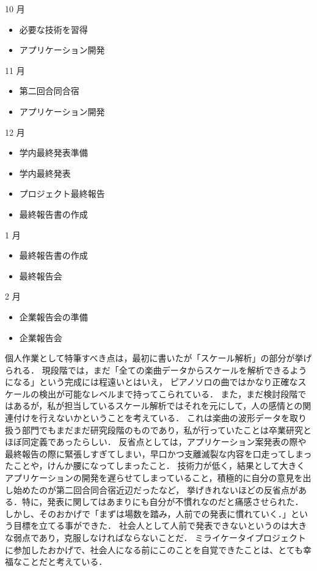 10 月
\begin{itemize}
\item 必要な技術を習得
\item アプリケーション開発
\end{itemize}
11 月
\begin{itemize}
\item 第二回合同合宿
\item アプリケーション開発
\end{itemize}
12 月
\begin{itemize}
\item 学内最終発表準備
\item 学内最終発表
\item プロジェクト最終報告
\item 最終報告書の作成
\end{itemize}
1 月
\begin{itemize}
\item 最終報告書の作成
\item 最終報告会
\end{itemize}
2 月
\begin{itemize}
\item 企業報告会の準備
\item 企業報告会
\end{itemize}
個人作業として特筆すべき点は，最初に書いたが「スケール解析」の部分が挙げられる．
現段階では，まだ「全ての楽曲データからスケールを解析できるようになる」という完成には程遠いとはいえ，
ピアノソロの曲ではかなり正確なスケールの検出が可能なレベルまで持ってこられている．
また，まだ検討段階ではあるが，私が担当しているスケール解析ではそれを元にして，人の感情との関連付けを行えないかということを考えている．
これは楽曲の波形データを取り扱う部門でもまだまだ研究段階のものであり，私が行っていたことは卒業研究とほぼ同定義であったらしい．
反省点としては，アプリケーション案発表の際や最終報告の際に緊張しすぎてしまい，早口かつ支離滅裂な内容を口走ってしまったことや，けんか腰になってしまったこと．
技術力が低く，結果として大きくアプリケーションの開発を遅らせてしまっていること，積極的に自分の意見を出し始めたのが第二回合同合宿近辺だったなど，
挙げきれないほどの反省点がある．特に，発表に関してはあまりにも自分が不慣れなのだと痛感させられた．
しかし、そのおかげで「まずは場数を踏み，人前での発表に慣れていく．」という目標を立てる事ができた．
社会人として人前で発表できないというのは大きな弱点であり，克服しなければならないことだ．
ミライケータイプロジェクトに参加したおかげで、社会人になる前にこのことを自覚できたことは、とても幸福なことだと考えている．\par
{}
